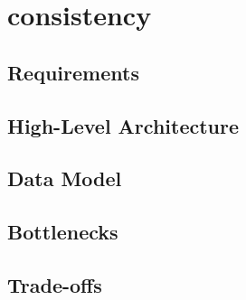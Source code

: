 \chapter{consistency}

\section{Requirements}
\section{High-Level Architecture}
\section{Data Model}
\section{Bottlenecks}
\section{Trade-offs}
